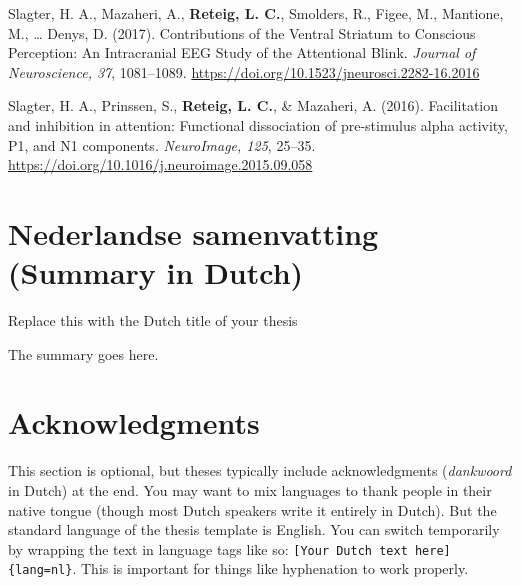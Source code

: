 \documentclass[12pt,american,a4paper,oneside,]{memoir} %
\newcommand{\textdutch}[2][]{\foreignlanguage{dutch}{#2}}
\newenvironment{dutch}[2][]{\begin{otherlanguage}{dutch}}{\end{otherlanguage}}
\begin{document}
Slagter, H. A., Mazaheri, A., \textbf{Reteig, L. C.}, Smolders, R., Figee, M., Mantione, M., \ldots{} Denys, D. (2017). Contributions of the Ventral Striatum to Conscious Perception: An Intracranial EEG Study of the Attentional Blink. \emph{Journal of Neuroscience, 37}, 1081--1089. \url{https://doi.org/10.1523/jneurosci.2282-16.2016}\newline

Slagter, H. A., Prinssen, S., \textbf{Reteig, L. C.}, \& Mazaheri, A. (2016). Facilitation and inhibition in attention: Functional dissociation of pre-stimulus alpha activity, P1, and N1 components. \emph{NeuroImage, 125}, 25--35. \url{https://doi.org/10.1016/j.neuroimage.2015.09.058}

\normalsize
\setlength{\parindent}{1.5em}

\hypertarget{nederlandse-samenvatting-summary-in-dutch}{%
\chapter*{Nederlandse samenvatting (Summary in Dutch)}\label{nederlandse-samenvatting-summary-in-dutch}}


\begin{dutch}

\emph{Replace this with the Dutch title of your thesis}

\bigskip

The summary goes here.

\end{dutch}

\hypertarget{acknowledgments}{%
\chapter*{Acknowledgments}\label{acknowledgments}}


This section is optional, but theses typically include acknowledgments (\textdutch{\emph{dankwoord}} in Dutch) at the end. You may want to mix languages to thank people in their native tongue (though most Dutch speakers write it entirely in Dutch). But the standard language of the thesis template is English. You can switch temporarily by wrapping the text in language tags like so: \texttt{{[}Your\ Dutch\ text\ here{]}\{lang=nl\}}. This is important for things like hyphenation to work properly.

\backmatter
\printbibliography
\end{document}
